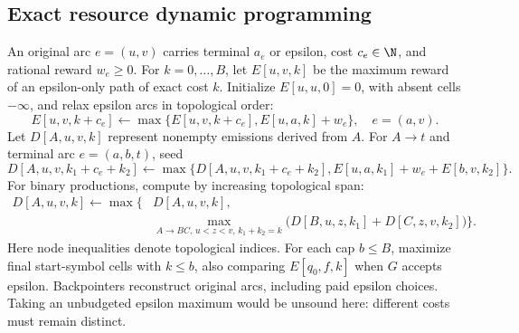 \subsection{Exact resource dynamic programming}

An original arc $e=(u,v)$ carries terminal $a_e$ or epsilon, cost $c_e\in\N$, and rational reward $w_e\geq0$. For $k=0,\ldots,B$, let $E[u,v,k]$ be the maximum reward of an epsilon-only path of exact cost $k$. Initialize $E[u,u,0]=0$, with absent cells $-\infty$, and relax epsilon arcs in topological order:
\begin{equation}
 E[u,v,k+c_e]\gets\max\{E[u,v,k+c_e],E[u,a,k]+w_e\},\quad e=(a,v).
 \label{eq:budget-epsilon}
\end{equation}
Let $D[A,u,v,k]$ represent nonempty emissions derived from $A$. For $A\to t$ and terminal arc $e=(a,b,t)$, seed
\begin{equation}
 D[A,u,v,k_1+c_e+k_2]\gets\max\{D[A,u,v,k_1+c_e+k_2],
       E[u,a,k_1]+w_e+E[b,v,k_2]\}.
 \label{eq:budget-leaf}
\end{equation}
For binary productions, compute by increasing topological span:
\begin{equation}
 \begin{aligned}
 D[A,u,v,k]\gets\max\bigl\{&D[A,u,v,k],\\
 &\max_{A\to BC,\,u<z<v,\,k_1+k_2=k}
       \bigl(D[B,u,z,k_1]+D[C,z,v,k_2]\bigr)\bigr\}.
 \end{aligned}
 \label{eq:budget-binary}
\end{equation}
Here node inequalities denote topological indices. For each cap $b\leq B$, maximize final start-symbol cells with $k\leq b$, also comparing $E[q_0,f,k]$ when $G$ accepts epsilon. Backpointers reconstruct original arcs, including paid epsilon choices. Taking an unbudgeted epsilon maximum would be unsound here: different costs must remain distinct.

